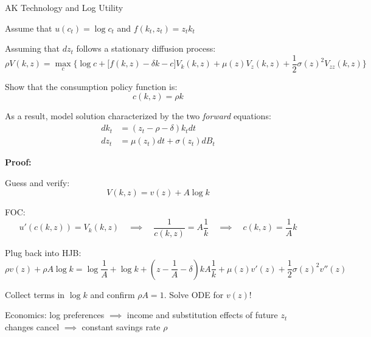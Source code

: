 \documentclass[11pt, aspectratio=169]{beamer}
\newenvironment{witemize}{\itemize\addtolength{\itemsep}{10pt}}{\enditemize}
\begin{document}
\begin{frame}{AK Technology and Log Utility}
\begin{witemize}
\item Assume that $u(c_t) = \log c_t$ and $f(k_t, z_t) = z_t k_t$

\item Assuming that $dz_t$ follows a stationary diffusion process:
\begin{equation*}
	\rho V(k, z) = \max_c \bigg\{ \log c + \Big[ f(k, z) - \delta k - c \Big] V_k(k, z) + \mu(z) V_z(k, z) + \frac{1}{2} \sigma(z)^2 V_{zz}(k, z) \bigg\}
\end{equation*}

\item Show that the consumption policy function is:
\begin{equation*}
	c(k, z) = \rho k
\end{equation*}

\item As a result, model solution characterized by the two \textit{forward} equations:
\begin{align*}
	dk_t &= (z_t - \rho - \delta) k_t dt \\
	dz_t &= \mu(z_t) dt + \sigma(z_t) dB_t
\end{align*}

\end{witemize}
\end{frame}


\begin{frame}{}
\textbf{Proof:}
\begin{witemize}
\item Guess and verify:
\begin{equation*}
	V(k, z) = v(z) + A \log k
\end{equation*}

\item FOC: 
\begin{equation*}
	u'(c(k, z)) = V_k(k, z) 
	\quad \implies \quad
	\frac{1}{c(k, z)} = A \frac{1}{k}
	\quad \implies \quad
	c(k, z) = \frac{1}{A} k
\end{equation*}

\item Plug back into HJB: 
\begin{equation*}
\rho v(z) + \rho A \log k = \log \frac{1}{A} + \log k + (z - \frac{1}{A} - \delta) k A \frac{1}{k} + \mu(z) v'(z) + \frac{1}{2} \sigma(z)^2 v''(z)
\end{equation*}

\item Collect terms in $\log k$ and confirm $\rho A = 1$. Solve ODE for $v(z)$!

\item Economics: log preferences $\implies$ income and substitution effects of future $z_t$ changes cancel $\implies$ constant savings rate $\rho$
\end{witemize}
\end{frame}
\end{document}

